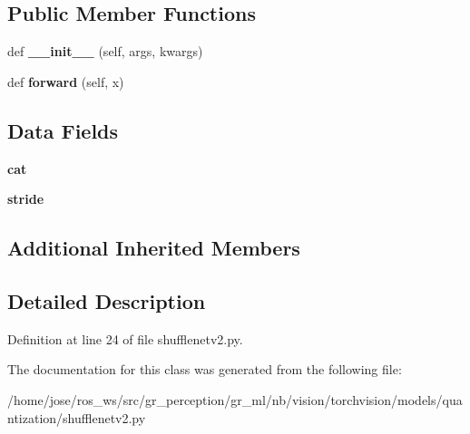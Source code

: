 \subsection*{Public Member Functions}
\begin{DoxyCompactItemize}
\item 
\mbox{\label{classtorchvision_1_1models_1_1quantization_1_1shufflenetv2_1_1QuantizableInvertedResidual_ad450db413ade5dac0e3c0590259ed288}} 
def {\bfseries \+\_\+\+\_\+init\+\_\+\+\_\+} (self, args, kwargs)
\item 
\mbox{\label{classtorchvision_1_1models_1_1quantization_1_1shufflenetv2_1_1QuantizableInvertedResidual_ad0cad3d86da72941386fa9b4e428aa9e}} 
def {\bfseries forward} (self, x)
\end{DoxyCompactItemize}
\subsection*{Data Fields}
\begin{DoxyCompactItemize}
\item 
\mbox{\label{classtorchvision_1_1models_1_1quantization_1_1shufflenetv2_1_1QuantizableInvertedResidual_a4ef348d18067c74c995391803111af87}} 
{\bfseries cat}
\item 
\mbox{\label{classtorchvision_1_1models_1_1quantization_1_1shufflenetv2_1_1QuantizableInvertedResidual_aa6d23501aed6eb91bce0e0446f21bc72}} 
{\bfseries stride}
\end{DoxyCompactItemize}
\subsection*{Additional Inherited Members}


\subsection{Detailed Description}


Definition at line 24 of file shufflenetv2.\+py.



The documentation for this class was generated from the following file\+:\begin{DoxyCompactItemize}
\item 
/home/jose/ros\+\_\+ws/src/gr\+\_\+perception/gr\+\_\+ml/nb/vision/torchvision/models/quantization/shufflenetv2.\+py\end{DoxyCompactItemize}
